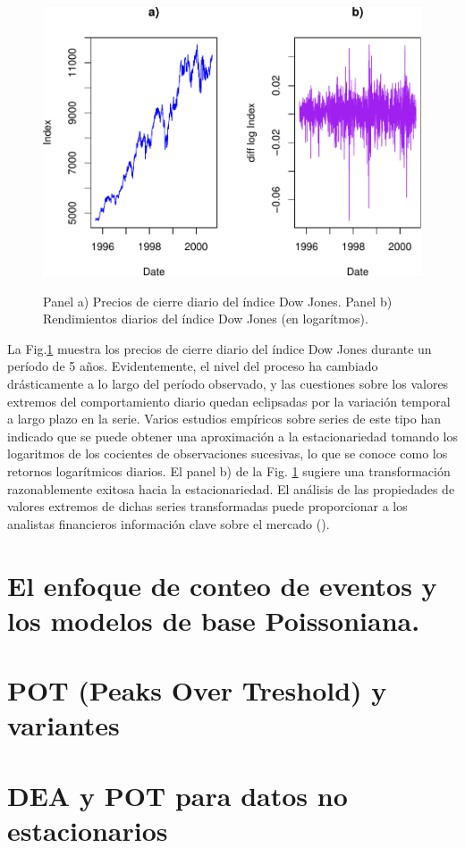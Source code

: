 \documentclass[
  20pt,
]{book}
\theoremstyle{definition}
\theoremstyle{definition}
\theoremstyle{definition}
\theoremstyle{definition}
\theoremstyle{remark}
\begin{document}
\begin{figure}

{\centering \includegraphics[width=0.8\linewidth,alt={Panel izquierdo: precios de cierre diario del índice Dow Jones.Panel derecho: rendimientos logarítmicos diarios del índice Dow Jones.}]{Extremales_files/figure-latex/nice-fig4-1} 

}

\caption{Panel a) Precios de cierre diario del índice Dow Jones. Panel b) Rendimientos diarios del índice Dow Jones (en logarítmos).}\label{fig:nice-fig4}
\end{figure}

La Fig.\ref{fig:nice-fig4} muestra los precios de cierre diario del índice Dow Jones durante un período de 5 años. Evidentemente, el nivel del proceso ha cambiado drásticamente a lo largo del período observado, y las cuestiones sobre los valores extremos del comportamiento diario quedan eclipsadas por la variación temporal a largo plazo en la serie. Varios estudios empíricos sobre series de este tipo han indicado que se puede obtener una aproximación a la estacionariedad tomando los logaritmos de los cocientes de observaciones sucesivas, lo que se conoce como los retornos logarítmicos diarios. El panel b) de la Fig. \ref{fig:nice-fig4} sugiere una transformación razonablemente exitosa hacia la estacionariedad. El análisis de las propiedades de valores extremos de dichas series transformadas puede proporcionar a los analistas financieros información clave sobre el mercado (\citet{coles2001introduction}).

\chapter{El enfoque de conteo de eventos y los modelos de base Poissoniana.}\label{el-enfoque-de-conteo-de-eventos-y-los-modelos-de-base-poissoniana.}

\chapter{POT (Peaks Over Treshold) y variantes}\label{pot-peaks-over-treshold-y-variantes}

\chapter{DEA y POT para datos no estacionarios}\label{dea-y-pot-para-datos-no-estacionarios}

  
\end{document}
